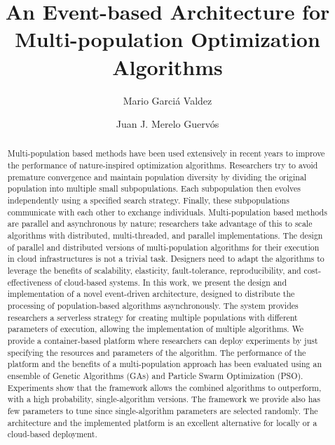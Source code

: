 \documentclass[review]{elsarticle}
\begin{document}
\begin{frontmatter}

\title{An Event-based Architecture for Multi-population Optimization Algorithms}

\author[itt]{Mario Garci\'a Valdez }

\author[granada]{Juan J. Merelo Guerv\'os}

\address[itt]{Department of Graduate Studies, Instituto Tecnol\'ogico de Tijuana, Tijuana BC, Mexico}
\address[granada]{Universidad de Granada, Granada, Spain}

\begin{abstract}
    Multi-population based methods have been used extensively in recent years to
    improve the performance of nature-inspired optimization algorithms.
    Researchers try to avoid premature convergence and maintain population
    diversity by dividing the original population into multiple small
    subpopulations. Each subpopulation then evolves independently using a
    specified search strategy. Finally, these subpopulations communicate with
    each other to exchange individuals. Multi-population based methods are
    parallel and asynchronous by nature; researchers take advantage of this to
    scale algorithms with distributed, multi-threaded, and parallel
    implementations. The design of parallel and distributed versions of
    multi-population algorithms for their execution in cloud infrastructures is
    not a trivial task. Designers need to adapt the algorithms to leverage the
    benefits of scalability, elasticity, fault-tolerance, reproducibility,  and
    cost-effectiveness of cloud-based systems. In this work, we present the
    design and implementation of a novel event-driven architecture, designed to
    distribute the processing of population-based algorithms asynchronously. The
    system provides researchers a serverless strategy for creating multiple
    populations with different parameters of execution, allowing the
    implementation of multiple algorithms. We provide a container-based platform
    where researchers can deploy experiments by just specifying the resources
    and parameters of the algorithm. The performance of the platform and the
    benefits of a multi-population approach has been evaluated using an ensemble
    of Genetic  Algorithms (GAs) and Particle Swarm Optimization (PSO).
    Experiments show that the framework allows the combined algorithms to
    outperform, with a high probability, single-algorithm versions. The
    framework we provide also has few parameters to tune since single-algorithm
    parameters are selected randomly. The architecture and the implemented
    platform is an excellent alternative for locally or a cloud-based
    deployment.
\end{abstract}


\end{frontmatter}
\end{document}
